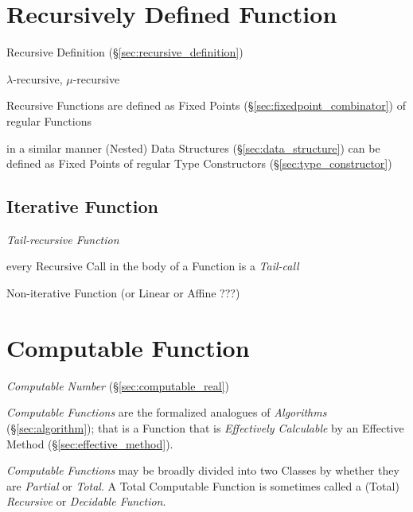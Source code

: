 \section{Recursively Defined Function}\label{sec:recursive_function}

Recursive Definition (\S\ref{sec:recursive_definition})

$\lambda$-recursive, $\mu$-recursive


Recursive Functions are defined as Fixed Points
(\S\ref{sec:fixedpoint_combinator}) of regular Functions

in a similar manner (Nested) Data Structures
(\S\ref{sec:data_structure}) can be defined as Fixed Points of regular
Type Constructors (\S\ref{sec:type_constructor})



\subsection{Iterative Function}\label{sec:iterative_function}

\emph{Tail-recursive Function}

every Recursive Call in the body of a Function is a \emph{Tail-call}

Non-iterative Function (or Linear or Affine ???) %



\section{Computable Function}\label{sec:computable_function}

\emph{Computable Number} (\S\ref{sec:computable_real})

\emph{Computable Functions} are the formalized analogues of
\emph{Algorithms} (\S\ref{sec:algorithm}); that is a Function that
is \emph{Effectively Calculable} by an Effective Method
(\S\ref{sec:effective_method}).

\emph{Computable Functions} may be broadly divided into two Classes by
whether they are \emph{Partial} or \emph{Total}. A Total Computable
Function is sometimes called a (Total) \emph{Recursive} or
\emph{Decidable Function}.


